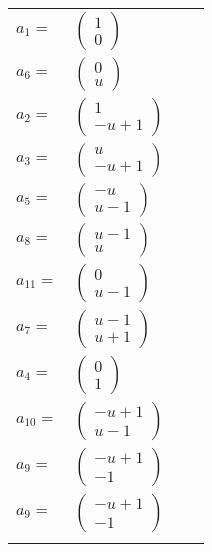 \documentclass[1p]{elsarticle_modified}
\theoremstyle{definition}
\begin{document}
\begin{tabular}{m{7pt} m{180pt} m{7pt} m{180pt} }
\flushright $a_{1}=$&$\begin{pmatrix}1\\0\end{pmatrix}$ \\
\flushright $a_{6}=$&$\begin{pmatrix}0\\u\end{pmatrix}$ \\
\flushright $a_{2}=$&$\begin{pmatrix}1\\- u+1\end{pmatrix}$ \\
\flushright $a_{3}=$&$\begin{pmatrix}u\\- u+1\end{pmatrix}$ \\
\flushright $a_{5}=$&$\begin{pmatrix}- u\\u-1\end{pmatrix}$ \\
\flushright $a_{8}=$&$\begin{pmatrix}u-1\\u\end{pmatrix}$ \\
\flushright $a_{11}=$&$\begin{pmatrix}0\\u-1\end{pmatrix}$ \\
\flushright $a_{7}=$&$\begin{pmatrix}u-1\\u+1\end{pmatrix}$ \\
\flushright $a_{4}=$&$\begin{pmatrix}0\\1\end{pmatrix}$ \\
\flushright $a_{10}=$&$\begin{pmatrix}- u+1\\u-1\end{pmatrix}$ \\
\flushright $a_{9}=$&$\begin{pmatrix}- u+1\\-1\end{pmatrix}$\\ \flushright $a_{9}=$&$\begin{pmatrix}- u+1\\-1\end{pmatrix}$\\&\end{tabular}
\end{document}

